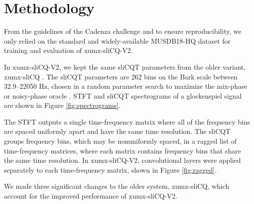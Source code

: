 \documentclass{INTERSPEECH2023}
\begin{document}
\section{Methodology}

From the guidelines of the Cadenza challenge and to ensure reproducibility, we only relied on the standard and widely-available MUSDB18-HQ dataset \cite{musdb18hq} for training and evaluation of xumx-sliCQ-V2.

In xumx-sliCQ-V2, we kept the same sliCQT parameters from the older variant, xumx-sliCQ \cite{hanssian21}. The sliCQT parameters are 262 bins on the Bark scale between 32.9--22050 Hz, chosen in a random parameter search to maximize the mix-phase or noisy-phase oracle \cite{hanssian21}. STFT and sliCQT spectrograms of a glockenspiel signal are shown in Figure \ref{fig:spectrograms}.

The STFT outputs a single time-frequency matrix where all of the frequency bins are spaced uniformly apart and have the same time resolution. The sliCQT groups frequency bins, which may be nonuniformly spaced, in a ragged list of time-frequency matrices, where each matrix contains frequency bins that share the same time resolution. In xumx-sliCQ-V2, convolutional layers were applied separately to each time-frequency matrix, shown in Figure \ref{fig:ragged}.

We made three significant changes to the older system, xumx-sliCQ, which account for the improved performance of xumx-sliCQ-V2.
\end{document}
